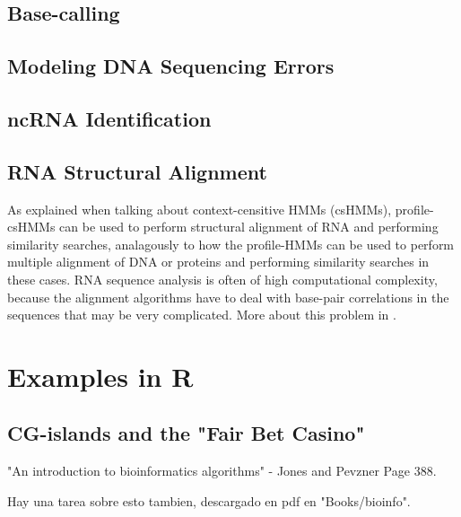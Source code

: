 \documentclass{article}
\begin{document}
\subsection{Base-calling}
\cite{Yoon2009}
\subsection{Modeling DNA Sequencing Errors}
\cite{Yoon2009}
\subsection{ncRNA Identification}
\cite{Yoon2009}
\subsection{RNA Structural Alignment}
As explained when talking about context-censitive HMMs (csHMMs), profile-csHMMs can be used to perform structural alignment of RNA and performing similarity searches, analagously to how the profile-HMMs can be used to perform multiple alignment of DNA or proteins and performing similarity searches in these cases. RNA sequence analysis is often of high computational complexity, because the alignment algorithms have to deal with base-pair correlations in the sequences that may be very complicated. More about this problem in \cite{Yoon2009}.

\section{Examples in R}

\subsection{CG-islands and the "Fair Bet Casino"}

"An introduction to bioinformatics algorithms" - Jones and Pevzner Page 388. 

Hay una tarea sobre esto tambien, descargado en pdf en "Books/bioinfo".
\end{document}

